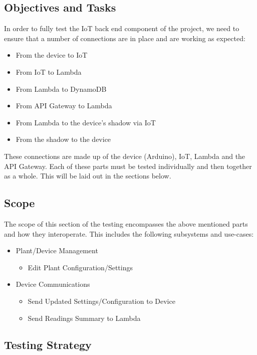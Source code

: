 \documentclass{article}
\begin{document}
	\subsection{Objectives and Tasks}
		In order to fully test the IoT back end component of the project, we need to ensure that a number of connections are
		in place and are working as expected:
		\begin{itemize}
			\item{From the device to IoT}
			\item{From IoT to Lambda}
			\item{From Lambda to DynamoDB}
			\\
			\item{From API Gateway to Lambda}
			\item{From Lambda to the device's shadow via IoT}
			\item{From the shadow to the device}
		\end{itemize}
		
		These connections are made up of the device (Arduino), IoT, Lambda and the API Gateway. Each of these parts must be
		tested individually and then together as a whole. This will be laid out in the sections below.
	\subsection{Scope}
		 The scope of this section of the testing encompasses the above mentioned parts and how they interoperate. This
		 includes the following subsystems and use-cases:
		 \begin{itemize}
		 	\item Plant/Device Management
				\begin{itemize}
					\item Edit Plant Configuration/Settings
				\end{itemize}
		 	\item Device Communications
			 	\begin{itemize}
			 		\item Send Updated Settings/Configuration to Device
			 		\item Send Readings Summary to Lambda
			 	\end{itemize}
		 \end{itemize}
		 
	\subsection{Testing Strategy}
\end{document}
